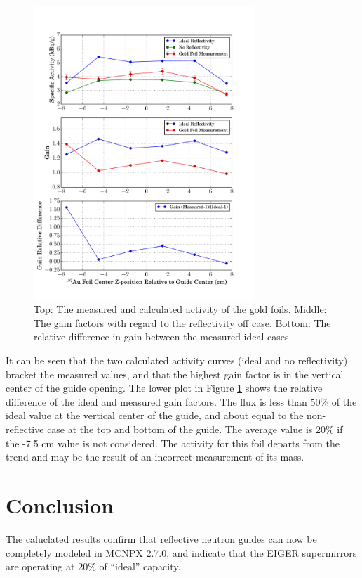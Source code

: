 \documentclass[a4paper,
              ]{jacow}
\begin{document}
\begin{figure}[!htb]
   \centering
   \includegraphics*[trim = 0mm 5mm 15mm 25mm, width=83mm]{graphics/GF_act.pdf}
   \caption{Top: The measured and calculated activity of the gold foils.  Middle:  The gain factors with regard to the reflectivity off case.  Bottom:  The relative difference in gain between the measured ideal cases.}
   \label{activation}
\end{figure}

It can be seen that the two calculated activity curves (ideal and no reflectivity) bracket the measured values, and that the highest gain factor is in the vertical center of the guide opening.  The lower plot in Figure \ref{activation} shows the relative difference of the ideal and measured gain factors.  The flux is less than 50\% of the ideal value at the vertical center of the guide, and about equal to the non-reflective case at the top and bottom of the guide.  The average value is 20\% if the -7.5 cm value is not considered.  The activity for this foil departs from the trend and may be the result of an incorrect measurement of its mass.


\section{Conclusion}

The caluclated results confirm that reflective neutron guides can now be completely modeled in MCNPX 2.7.0, and indicate that the EIGER supermirrors are operating at 20\% of ``ideal'' capacity.  
\end{document}
